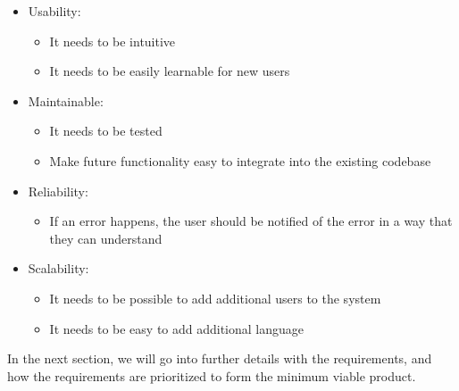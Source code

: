 \begin{itemize}
    \item Usability:
    \begin{itemize}
        \item It needs to be intuitive
        \item It needs to be easily learnable for new users
    \end{itemize}
    \item Maintainable:
    \begin{itemize}
        \item It needs to be tested
        \item Make future functionality easy to integrate into the existing codebase
    \end{itemize}
    \item Reliability:
    \begin{itemize}
        \item If an error happens, the user should be notified of the error in a way that they can understand
    \end{itemize}
    \item Scalability:
    \begin{itemize}
        \item It needs to be possible to add additional users to the system
        \item It needs to be easy to add additional language
    \end{itemize}
\end{itemize}
\noindent
In the next section, we will go into further details with the requirements, and how the requirements are prioritized to form the minimum viable product.
